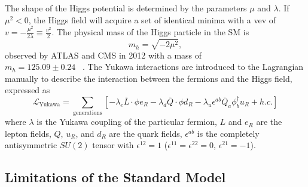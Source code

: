 The shape of the Higgs potential is determined by the parameters $\mu$ and $\lambda$. 
If $\mu^2 < 0$, the Higgs field will acquire a set of identical minima with a vev of 
$v=-\frac{\mu^2}{2\lambda} \equiv \frac{v^2}{2}$. The physical mass of the Higgs particle in the SM is
\begin{equation}
m_h = \sqrt{-2\mu^2},
\label{eq:theory.sm.mh}
\end{equation}
observed by ATLAS and CMS in 2012 with a mass of \\
$m_h = 125.09 \pm 0.24$ \GeV~\cite{atlas_higgs,cms_higgs}.
The Yukawa interactions are introduced to the Lagrangian manually to describe the interaction between the fermions and the Higgs field, 
expressed as 
\begin{equation}
 \mathcal{L}_\text{Yukawa} = \sum_\text{generations} \left[-\lambda_e \overline{L} \cdot \phi e_R - \lambda_d \overline{Q} \cdot \phi d_R 
 - \lambda_u \epsilon^{ab} \overline{Q}_a \phi_b^{\dagger} u_R + h.c. \right]
\end{equation}
where $\lambda$ is the Yukawa coupling of the particular fermion, $L$ and $e_R$ are the lepton fields, 
$Q$, $u_R$, and $d_R$ are the quark fields, $\epsilon^{ab} $ is the completely antisymmetric  $ SU\left(2\right) $ tensor 
with $\epsilon^{12} = 1$ ($\epsilon^{11} = \epsilon^{22} = 0$, $\epsilon^{21} = -1$).


\subsection{Limitations of the Standard Model}

